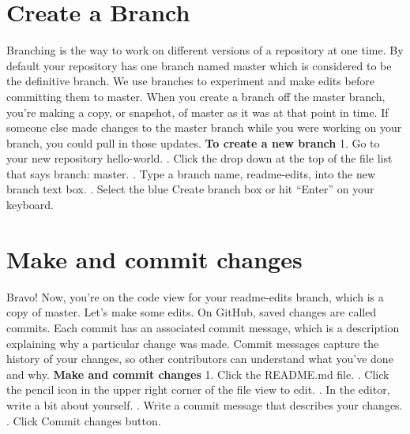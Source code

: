 \documentclass[11pt]{report}
\begin{document}
\chapter{Create a Branch}
Branching is the way to work on different versions of a repository at one time.
\newline
\newline By default your repository has one branch named master which is considered to be the definitive branch. We use branches to experiment and make edits before committing them to master.
\newline
\newline When you create a branch off the master branch, you’re making a copy, or snapshot, of master as it was at that point in time. If someone else made changes to the master branch while you were working on your branch, you could pull in those updates.
\newline
\newline \textbf {\LARGE To create a new branch}
\newline
\newline \small 1. Go to your new repository hello-world.
\newline
{}. Click the drop down at the top of the file list that says branch: master.
\newline
{}. Type a branch name, readme-edits, into the new branch text box.
\newline
{}. Select the blue Create branch box or hit “Enter” on your keyboard.

\chapter{Make and commit changes}
Bravo! Now, you’re on the code view for your readme-edits branch, which is a copy of master. Let’s make some edits.
\newline
\newline On GitHub, saved changes are called commits. Each commit has an associated commit message, which is a description explaining why a particular change was made. Commit messages capture the history of your changes, so other contributors can understand what you’ve done and why.
\newline
\newline \textbf {\LARGE Make and commit changes}
\newline
\newline \small 1. Click the README.md file.
\newline
{}. Click the  pencil icon in the upper right corner of the file view to edit.
\newline
{}. In the editor, write a bit about yourself.
\newline
{}. Write a commit message that describes your changes.
\newline
{}. Click Commit changes button.
\end{document}
